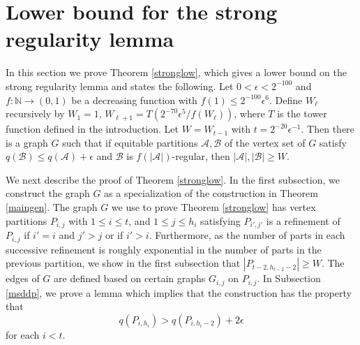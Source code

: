 \documentclass[11pt]{article}
\begin{document}
\section{Lower bound for the strong regularity lemma}\label{strongsect}

In this section we prove Theorem \ref{stronglow}, which gives a lower bound on
the strong regularity lemma and states the following. Let $0<\epsilon<2^{-100}$ and $f:\mathbb{N} \rightarrow (0,1)$ be a decreasing function with
$f(1) \leq 2^{-100}\epsilon^{6}$. Define $W_{\ell}$ recursively by $W_1=1$,
$W_{\ell+1} = T\left(2^{-70}\epsilon^5/f(W_{\ell})\right)$, where $T$ is the
tower function defined in the introduction. Let $W=W_{t-1}$ with
$t=2^{-20}\epsilon^{-1}$. Then there is a graph $G$ such that if equitable
partitions $\mathcal{A},\mathcal{B}$ of the vertex set of $G$ satisfy
$q(\mathcal{B}) \leq q(\mathcal{A})+\epsilon$ and $\mathcal{B}$ is
$f(|\mathcal{A}|)$-regular, then $|\mathcal{A}|,|\mathcal{B}| \geq W$.

We next describe the proof of Theorem \ref{stronglow}.  In the first subsection, we construct the graph $G$ as a specialization of the construction in Theorem \ref{maingen}. The graph $G$ we
use to prove Theorem \ref{stronglow} has vertex partitions
$P_{i,j}$ with $1 \leq i \leq t$, and $1 \leq j \leq h_i$ satisfying
$P_{i',j'}$ is a refinement of $P_{i,j}$ if $i'=i$ and $j' > j$ or if $i'>i$.
Furthermore, as the number of parts in each successive refinement is roughly
exponential in the number of parts in the previous partition, we show in the first subsection that $|P_{t-2,h_{t-2}-2}| \geq W$. The edges of $G$ are defined based on certain
graphs $G_{i,j}$ on $P_{i,j}$. In Subsection \ref{msddp}, we prove a lemma
which implies that the construction has the property that \begin{equation}
\label{eq1msd} q(P_{i,h_i})>q(P_{i,h_i-2})+2\epsilon\end{equation} for each
$i<t$.
\end{document}
